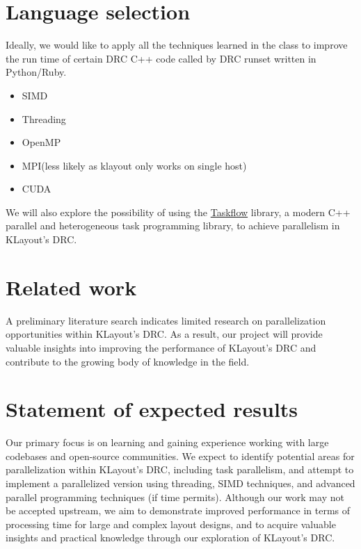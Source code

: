 \documentclass[sigconf]{acmart}
\begin{document}
\section{Language selection}
Ideally, we would like to apply all the techniques learned in the class to improve the run time of certain DRC C++ code called by DRC runset written in Python/Ruby.
\begin{itemize}
  \item SIMD
  \item Threading 
  \item OpenMP 
  \item MPI(less likely as klayout only works on single host)
  \item CUDA
\end{itemize}
We will also explore the possibility of using the \href{https://taskflow.github.io/}{Taskflow} library, a modern C++ parallel and heterogeneous task programming library, to achieve parallelism in KLayout's DRC.

\section{Related work}
A preliminary literature search indicates limited research on parallelization opportunities within KLayout's DRC. As a result, our project will provide valuable insights into improving the performance of KLayout's DRC and contribute to the growing body of knowledge in the field.

\section{Statement of expected results}
Our primary focus is on learning and gaining experience working with large codebases and open-source communities. We expect to identify potential areas for parallelization within KLayout's DRC, including task parallelism, and attempt to implement a parallelized version using threading, SIMD techniques, and advanced parallel programming techniques (if time permits). Although our work may not be accepted upstream, we aim to demonstrate improved performance in terms of processing time for large and complex layout designs, and to acquire valuable insights and practical knowledge through our exploration of KLayout's DRC.
\end{document}
